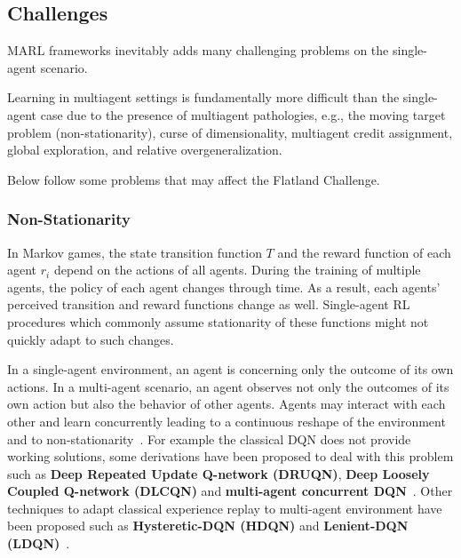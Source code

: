 \documentclass[11pt, a4paper, hidelinks]{report}
\begin{document}
\subsection{Challenges}\label{subsec:challenges}

MARL frameworks inevitably adds many challenging problems on the single-agent scenario.
\begin{quoting}[font=itshape, begintext={"}, endtext={"\citep{Hernandez-Leal-2019}}]
Learning in multiagent settings is fundamentally more difficult than the single-agent case due to the presence of multiagent pathologies, e.g., the moving target problem (non-stationarity), curse of dimensionality, multiagent credit assignment, global exploration, and relative overgeneralization.
\end{quoting}

Below follow some problems that may affect the Flatland Challenge.

\subsubsection{Non-Stationarity}

\begin{quoting}[font=itshape, begintext={"}, endtext={"\citep{papoudakis2019dealing}}]
In Markov games, the state transition function $T$ and the reward function of each agent $r_i$ depend on the actions of all agents.
During the training of multiple agents, the policy of each agent changes through time.
As a result, each agents’ perceived transition and reward functions change as well.
Single-agent RL procedures which commonly assume stationarity of these functions might not quickly adapt to such changes.
\end{quoting}

In a single-agent environment, an agent is concerning only the outcome of its own actions.
In a multi-agent scenario, an agent observes not only the outcomes of its own action but also the behavior of other agents.
Agents may interact with each other and learn concurrently leading to a continuous reshape of the environment and to non-stationarity~\citep{zhang2019multiagent}.
For example the classical DQN does not provide working solutions, some derivations have been proposed to deal with this problem such as \textbf{Deep Repeated Update Q-network (DRUQN)}, \textbf{Deep Loosely Coupled Q-network (DLCQN)} and \textbf{ multi-agent concurrent DQN}~\citep{castaneda}.
Other techniques to adapt classical experience replay to multi-agent environment have been proposed such as \textbf{Hysteretic-DQN (HDQN)} and \textbf{Lenient-DQN (LDQN)}~\citep{Nguyen-2020}.
\end{document}
